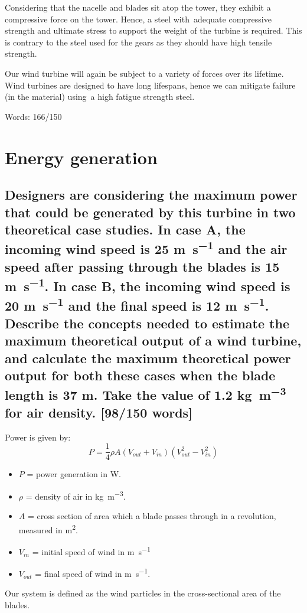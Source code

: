\documentclass[12pt]{article}
\numberwithin{equation}{section}
\begin{document}
\begin{flushleft}
Considering that the nacelle and blades sit atop the tower, they exhibit a compressive force on the tower. Hence, a steel with adequate compressive strength and ultimate stress to support the weight of the turbine is required. This is contrary to the steel used for the gears as they should have high tensile strength. 

Our wind turbine will again be subject to a variety of forces over its lifetime. Wind turbines are designed to have long lifespans, hence we can mitigate failure (in the material) using a high fatigue strength steel.

Words: 166/150

\section{Energy generation}
\subsection[Maximum power generation.]{Designers are considering the maximum power that could be generated by this turbine in two theoretical case studies. In case A, the incoming wind speed is 25 \si{\meter\per\second} and the air speed after passing through the blades is 15 \si{\meter\per\second}. In case B, the incoming wind speed is 20 \si{\meter\per\second} and the final speed is 12 \si{\meter\per\second}. Describe the concepts needed to estimate the maximum theoretical output of a wind turbine, and calculate the maximum theoretical power output for both these cases when the blade length is 37 \si{\meter}. Take the value of 1.2 \si{\kg\per\meter\cubed} for air density. [98/150 words]}
Power is given by:
\begin{equation}
  P = \frac{1}{4} \rho A (V_{out} + V_{in})(V_{out}^2 - V_{in}^2)
\end{equation}
\begin{itemize}
  \item $P$ = power generation in \si{\watt}.
  \item $\rho$ = density of air in \si{\kg\per\meter\cubed}.
  \item $A$ = cross section of area which a blade passes through in a revolution, measured in \si{\meter\squared}.
  \item $V_{in}$ = initial speed of wind in \si{\meter\per\second}
  \item $V_{out}$ = final speed of wind in \si{\meter\per\second}.
\end{itemize}
Our system is defined as the wind particles in the cross-sectional area of the blades.

\end{flushleft}
\end{document}
